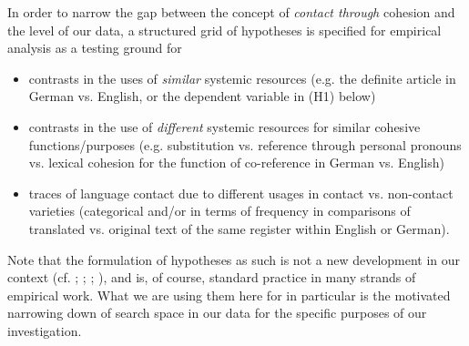 \documentclass[output=paper]{LSP/langsci}
\begin{document}
In order to narrow the gap between the concept of \textit{contact through} cohesion and the level of our data, a structured grid of hypotheses is specified for empirical analysis as a testing ground for 


\begin{itemize}
\item
contrasts in the uses of \textit{similar }systemic resources (e.g. the definite article in German vs. English, or the dependent variable in {(H1)} below)
\item
contrasts in the use of \textit{different} systemic resources for similar cohesive functions/purposes (e.g. substitution vs. reference through personal pronouns vs. lexical cohesion for the function of co-reference in German vs. English)
\item
traces of language contact due to different usages in contact vs. non-con\-tact varieties (categorical and/or in terms of frequency in comparisons of translated vs. original text of the same register within English or German). 
\end{itemize}

Note that the formulation of hypotheses as such is not a new development in our context (cf. \citealt[141ff]{Steiner1991}; \citealt[143ff]{Teich2003}; \citealt[127ff]{Hansen2003}; \citealt[89ff]{Neumann2008}), and is, of course, standard practice in many strands of empirical work. What we are using them here for in particular is the motivated narrowing down of search space in our data for the specific purposes of our investigation. 
\end{document}
